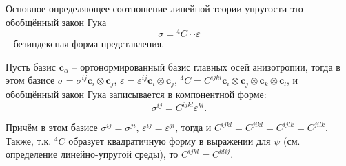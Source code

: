 
Основное определяющее соотношение линейной теории упругости это обобщённый закон Гука
\[
  \sigma = {}^4 C \cdot\cdot \varepsilon
\]
-- безиндексная форма представления.

Пусть базис $\mathbf{c}_\alpha$ -- ортонормированный базис главных осей анизотропии, тогда в этом базисе
$\sigma = \sigma^{ij} \mathbf{c}_i \otimes \mathbf{c}_j$,
$\varepsilon = \varepsilon^{ij} \mathbf{c}_i \otimes \mathbf{c}_j$, 
${}^4 C = C^{ijkl} \mathbf{c}_i \otimes \mathbf{c}_j \otimes \mathbf{c}_k \otimes \mathbf{c}_l$, и обобщённый закон Гука записывается в компонентной форме:
\[
  \sigma^{ij} = C^{ijkl} \varepsilon^{kl}.
\]

Причём в этом базисе $\sigma^{ij} = \sigma^{ji}$, $\varepsilon^{ij} = \varepsilon^{ji}$,
тогда и $C^{ijkl} = C^{jikl} = C^{ijlk} = C^{jilk}$. Также, т.к. ${}^4 C$ образует
квадратичную форму в выражении для $\psi$ (см. определение линейно-упругой среды), то
$C^{ijkl} = C^{klij}$.
